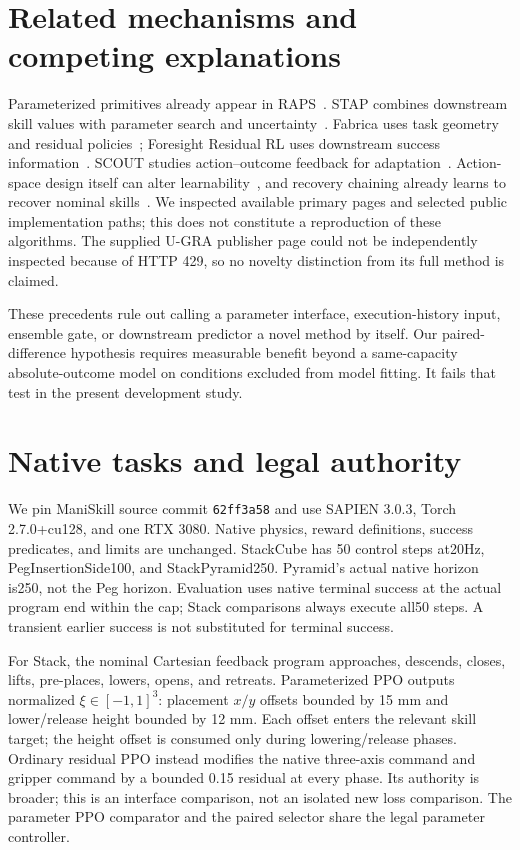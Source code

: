 \documentclass[10pt,a4paper,twocolumn]{article}
\begin{document}
\section{Related mechanisms and competing explanations}
Parameterized primitives already appear in RAPS~\cite{raps}. STAP combines downstream skill values with parameter search and uncertainty~\cite{stap}. Fabrica uses task geometry and residual policies~\cite{fabrica}; Foresight Residual RL uses downstream success information~\cite{foresight}. SCOUT studies action--outcome feedback for adaptation~\cite{scout}. Action-space design itself can alter learnability~\cite{action}, and recovery chaining already learns to recover nominal skills~\cite{recovery}. We inspected available primary pages and selected public implementation paths; this does not constitute a reproduction of these algorithms. The supplied U-GRA publisher page could not be independently inspected because of HTTP 429, so no novelty distinction from its full method is claimed.

These precedents rule out calling a parameter interface, execution-history input, ensemble gate, or downstream predictor a novel method by itself. Our paired-difference hypothesis requires measurable benefit beyond a same-capacity absolute-outcome model on conditions excluded from model fitting. It fails that test in the present development study.

\section{Native tasks and legal authority}
We pin ManiSkill source commit \texttt{62ff3a58} and use SAPIEN 3.0.3, Torch 2.7.0+cu128, and one RTX 3080. Native physics, reward definitions, success predicates, and limits are unchanged. StackCube has 50 control steps at20Hz, PegInsertionSide100, and StackPyramid250. Pyramid's actual native horizon is250, not the Peg horizon. Evaluation uses native terminal success at the actual program end within the cap; Stack comparisons always execute all50 steps. A transient earlier success is not substituted for terminal success.

For Stack, the nominal Cartesian feedback program approaches, descends, closes, lifts, pre-places, lowers, opens, and retreats. Parameterized PPO outputs normalized $\xi\in[-1,1]^3$: placement $x/y$ offsets bounded by 15 mm and lower/release height bounded by 12 mm. Each offset enters the relevant skill target; the height offset is consumed only during lowering/release phases. Ordinary residual PPO instead modifies the native three-axis command and gripper command by a bounded 0.15 residual at every phase. Its authority is broader; this is an interface comparison, not an isolated new loss comparison. The parameter PPO comparator and the paired selector share the legal parameter controller.
\end{document}
